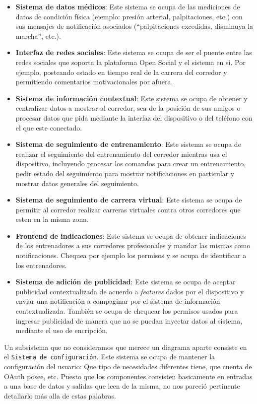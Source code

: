\begin{itemize}
	\item \textbf{Sistema de datos médicos}: Este sistema se ocupa de
	las mediciones de datos de condición física (ejemplo: presión
	arterial, palpitaciones, etc.) con sus mensajes de notificación
	asociados (``palpitaciones excedidas, disminuya la marcha'', etc.).
	\item \textbf{Interfaz de redes sociales}: Este sistema se ocupa
	de ser el puente entre las redes sociales que soporta la plataforma
	Open Social y el sistema en si. Por ejemplo, posteando estado en
	tiempo real de la carrera del corredor y permitiendo comentarios
	motivacionales por afuera.
	\item \textbf{Sistema de información contextual}: Este sistema se ocupa
	de obtener y centralizar datos a mostrar al corredor, sea de la 
	posición de sus amigos o procesar datos que pida mediante la
	interfaz del dispositivo o del teléfono con el que este conectado.
	\item \textbf{Sistema de seguimiento de entrenamiento}: Este sistema se
	ocupa de realizar el seguimiento del entrenamiento del corredor
	mientras usa el dispositivo, incluyendo procesar los comandos para crear
	un entrenamiento, pedir estado del seguimiento para mostrar 
	notificaciones en particular y mostrar datos generales del seguimiento.	
	\item \textbf{Sistema de seguimiento de carrera virtual}: Este sistema
	se ocupa de permitir al corredor realizar carreras virtuales contra 
	otros corredores que esten en la misma zona.
	\item \textbf{Frontend de indicaciones}: Este sistema se ocupa de
	obtener indicaciones de los entrenadores a sus corredores profesionales
	y mandar las mismas como notificaciones. Chequea por ejemplo los permisos
	y se ocupa de identificar a los entrenadores.
	\item \textbf{Sistema de adición de publicidad}: Este sistema se ocupa de 
	aceptar publicidad contextualizada de acuerdo a \textit{features} dados
	por el dispositivo y enviar una notificación a compaginar por el sistema 
	de información contextualizada. También se ocupa de chequear los permisos
	usados para ingresar publicidad de manera que no se puedan inyectar 
	datos al sistema,  mediante el uso de encripción.
\end{itemize}

Un subsistema que no consideramos que merece un diagrama aparte consiste en
el \texttt{Sistema de configuración}. Este sistema se ocupa de mantener la
configuración del usuario: Que tipo de necesidades diferentes tiene, que 
cuenta de OAuth posee, etc. Puesto que los componentes consisten basicamente
en entradas a una base de datos y salidas que leen de la misma, no nos
pareció pertinente detallarlo más alla de estas palabras.

